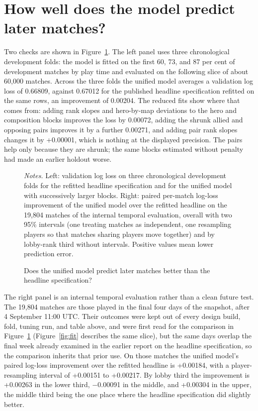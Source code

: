 \documentclass[11pt]{article}
\begin{document}
\section*{How well does the model predict later matches?}

Two checks are shown in Figure~\ref{fig:pred}. The left panel uses three chronological development folds:
the model is fitted on the first 60, 73, and 87 per cent of development matches by play time and
evaluated on the following slice of about 60{,}000 matches. Across the three folds the unified model
averages a validation log loss of 0.66809, against 0.67012 for the published headline specification
refitted on the same rows, an improvement of 0.00204. The reduced fits show where that comes from:
adding rank slopes and hero-by-map deviations to the hero and composition blocks improves the loss by
0.00072, adding the shrunk allied and opposing pairs improves it by a further 0.00271, and
adding pair rank slopes changes it by +0.00001, which is nothing at the displayed precision. The
pairs help only because they are shrunk; the same blocks estimated without penalty had made an earlier
holdout worse.

\begin{figure}[!tb]\centering
\caption{Does the unified model predict later matches better than the headline specification?}
\label{fig:pred}
\vspace{2pt}


\begin{minipage}{0.95\linewidth}\footnotesize\vspace{2pt}
\emph{Notes.} Left: validation log loss on three chronological development folds for the refitted headline
specification and for the unified model with successively larger blocks. Right: paired per-match log-loss
improvement of the unified model over the refitted headline on the 19,804 matches of the internal
temporal evaluation, overall with two 95\% intervals (one treating matches as independent, one resampling
players so that matches sharing players move together) and by lobby-rank third without intervals. Positive
values mean lower prediction error.
\end{minipage}
\end{figure}

The right panel is an internal temporal evaluation rather than a clean future test. The 19,804 matches
are those played in the final four days of the snapshot, after 4 September 11:00 UTC. Their outcomes were kept
out of every design build, fold, tuning run, and table above, and were first read for the comparison in
Figure~\ref{fig:pred} (Figure~\ref{fig:fit} describes the same slice), but the same days overlap
the final week already examined in the earlier report on the headline specification, so the comparison
inherits that prior use. On those matches the unified model's paired log-loss improvement over the
refitted headline is +0.00184, with a player-resampling interval of +0.00151 to +0.00217. By lobby
third the improvement is +0.00263 in the lower third, $-$0.00091 in the middle, and +0.00304 in the
upper, the middle third being the one place where the headline specification did slightly better.
\end{document}
